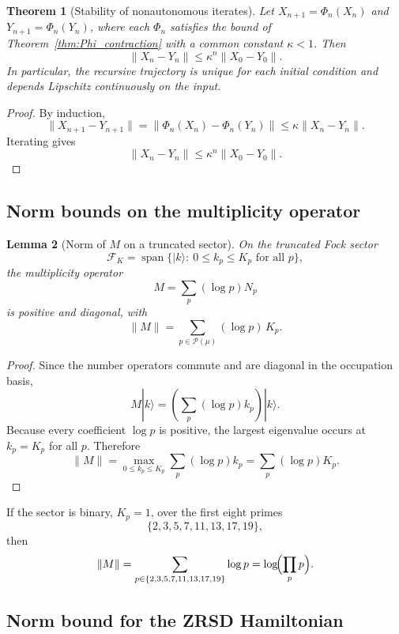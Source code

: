 \documentclass[12pt]{amsart}
\theoremstyle{plain}
\newtheorem{theorem}{Theorem}[section]
\newtheorem{lemma}[theorem]{Lemma}
\begin{document}
\begin{theorem}[Stability of nonautonomous iterates]
\label{thm:trajectory_stability}
Let \(X_{n+1}=\Phi_n(X_n)\) and \(Y_{n+1}=\Phi_n(Y_n)\), where each \(\Phi_n\) satisfies the bound of Theorem~\ref{thm:Phi_contraction} with a common constant \(\kappa<1\). Then
\[
\|X_n-Y_n\| \le \kappa^n \|X_0-Y_0\|.
\]
In particular, the recursive trajectory is unique for each initial condition and depends Lipschitz continuously on the input.
\end{theorem}

\begin{proof}
By induction,
\[
\|X_{n+1}-Y_{n+1}\|
=
\|\Phi_n(X_n)-\Phi_n(Y_n)\|
\le
\kappa \|X_n-Y_n\|.
\]
Iterating gives
\[
\|X_n-Y_n\|\le \kappa^n \|X_0-Y_0\|.
\]
\end{proof}

\subsection{Norm bounds on the multiplicity operator}

\begin{lemma}[Norm of \(M\) on a truncated sector]
\label{lem:M_bound}
On the truncated Fock sector
\[
\mathcal F_K
=
\operatorname{span}\{
|k\rangle:\ 0\le k_p\le K_p \text{ for all } p
\},
\]
the multiplicity operator
\[
M=\sum_p (\log p) N_p
\]
is positive and diagonal, with
\[
\|M\| = \sum_{p\in\mathcal P(\mu)} (\log p)\,K_p.
\]
\end{lemma}

\begin{proof}
Since the number operators commute and are diagonal in the occupation basis,
\[
M|k\rangle
=
\left(\sum_p (\log p)k_p\right)|k\rangle.
\]
Because every coefficient \(\log p\) is positive, the largest eigenvalue occurs at \(k_p=K_p\) for all \(p\). Therefore
\[
\|M\|
=
\max_{0\le k_p\le K_p}\sum_p (\log p)k_p
=
\sum_p (\log p)K_p.
\]
\end{proof}

\begin{corollary}
If the sector is binary, \(K_p=1\), over the first eight primes
\[
\{2,3,5,7,11,13,17,19\},
\]
then
\[
\|M\| = \sum_{p\in\{2,3,5,7,11,13,17,19\}} \log p
=
\log\!\Bigl(\prod_{p} p\Bigr).
\]
\end{corollary}

\subsection{Norm bound for the ZRSD Hamiltonian}
\end{document}
